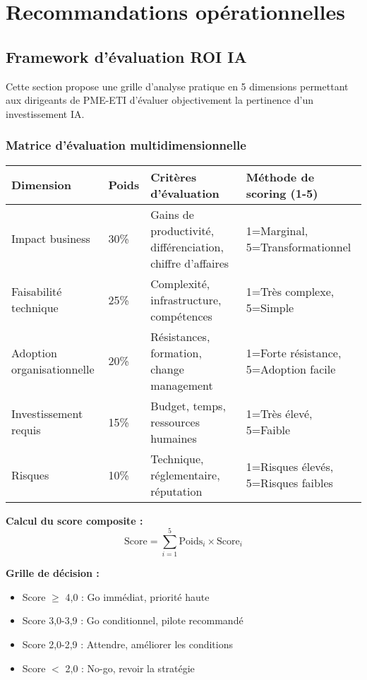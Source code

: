 \chapter{Recommandations opérationnelles}
\label{app:recommandations}

\section{Framework d'évaluation ROI IA}

Cette section propose une grille d'analyse pratique en 5 dimensions permettant aux dirigeants de PME-ETI d'évaluer objectivement la pertinence d'un investissement IA.

\subsection{Matrice d'évaluation multidimensionnelle}

\begin{longtable}{@{}p{3cm}p{2cm}p{4cm}p{5cm}@{}}
\toprule
\textbf{Dimension} & \textbf{Poids} & \textbf{Critères d'évaluation} & \textbf{Méthode de scoring (1-5)} \\
\midrule
Impact business & 30\% & Gains de productivité, différenciation, chiffre d'affaires & 1=Marginal, 5=Transformationnel \\
Faisabilité technique & 25\% & Complexité, infrastructure, compétences & 1=Très complexe, 5=Simple \\
Adoption organisationnelle & 20\% & Résistances, formation, change management & 1=Forte résistance, 5=Adoption facile \\
Investissement requis & 15\% & Budget, temps, ressources humaines & 1=Très élevé, 5=Faible \\
Risques & 10\% & Technique, réglementaire, réputation & 1=Risques élevés, 5=Risques faibles \\
\bottomrule
\end{longtable}

\textbf{Calcul du score composite :}
\[
\text{Score} = \sum_{i=1}^{5} \text{Poids}_i \times \text{Score}_i
\]

\textbf{Grille de décision :}
\begin{itemize}
    \item Score $\geq$ 4,0 : Go immédiat, priorité haute
    \item Score 3,0-3,9 : Go conditionnel, pilote recommandé
    \item Score 2,0-2,9 : Attendre, améliorer les conditions
    \item Score $<$ 2,0 : No-go, revoir la stratégie
\end{itemize}

